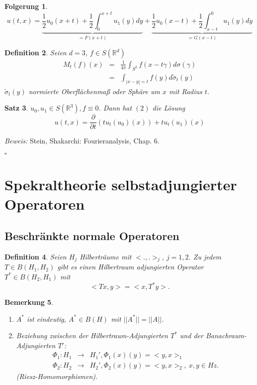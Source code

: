 \documentclass[12pt,a4paper,titlepage]{scrartcl}
\newtheorem{Satz}{Satz}[subsection]
\newtheorem{Definition}[Satz]{Definition}
\newtheorem{Bemerkung}[Satz]{Bemerkung}
\newtheorem{Folgerung}[Satz]{Folgerung}
\numberwithin{equation}{section}
\newcommand{\R}{\mathbb{R}} %
\newcommand{\Bew}{\emph{Beweis: }}
\newcommand{\qed}{\begin{flushright}
		$\square$
	\end{flushright}}
\begin{document}
	
	\begin{Folgerung}
		\[ u(t, x) = \underbrace{\frac{1}{2}u_{0}(x + t) + \frac{1}{2} \int_{0}^{x+t} u_{1}(y)dy}_{= F(x+t)} + \underbrace{\frac{1}{2} u_{0}(x-t) + \frac{1}{2}\int_{x-t}^{0} u_{1}(y)dy}_{= G(x-t)} \]
	\end{Folgerung}
	
	
	\begin{Definition}
		Seien $d = 3$, $f \in S(\R^{d})$
		\begin{eqnarray*}
			M_{t}(f)(x) &=& \frac{1}{4 \pi} \int_{S^{2}} f(x - t\gamma) d\sigma(\gamma) \\
			&=& \int_{|x-y|=t} f(y) d\tilde{\sigma}_{t}(y)
		\end{eqnarray*}
		$\tilde{\sigma}_{t}(y)$ normierte Oberflächenmaß oder Sphäre um $x$ mit Radius $t$.
	\end{Definition}
	
	
	\begin{Satz}
		$u_{0}, u_{1} \in S(\R^{3}), f \equiv 0$. Dann hat $(2)$ die Lösung
		\[ u(t, x) = \frac{\partial}{\partial t} \left( t u_{t}(u_{0})(x) \right) + t u_{t}(u_{1})(x) \]	
	\end{Satz}
	
	\Bew
		Stein, Shakarchi: Fourieranalysis, Chap. 6.
	\qed	
	
	\newpage
	\section{Spekraltheorie selbstadjungierter Operatoren}
	
	\subsection{Beschränkte normale Operatoren}
	
	\begin{Definition}
		Seien $H_j$ Hilberträume mit $<.,.>_j$, $j = 1,2$. Zu jedem $T\in B(H_1,H_2)$ gibt es einen Hilbertraum adjungierten Operator $T^*\in B(H_2,H_1)$ mit 
		$$<Tx,y> = <x,T^*y>.$$
	\end{Definition}
	
	\begin{Bemerkung}
		~
		\begin{enumerate}
			\item[a)] $A^*$ ist eindeutig, $A^* \in B(H)$ mit $||A^*|| = ||A||$.
			\item[b)] Beziehung zwischen der Hilbertraum-Adjungierten $T^*$ und der Banachraum-Adjungierten $T'$: 
			\begin{eqnarray}
				\Phi_1:H_1&\rightarrow& H_1', \Phi_1(x)(y) = <y,x>_1\nonumber\\
				\Phi_2: H_2&\rightarrow& H_2', \Phi_2(x)(y) = <y,x>_2,~x,y\in Hz.\nonumber
			\end{eqnarray}
			(Riesz-Homomorphismen).
		\end{enumerate}
	\end{Bemerkung}
	
\end{document}
